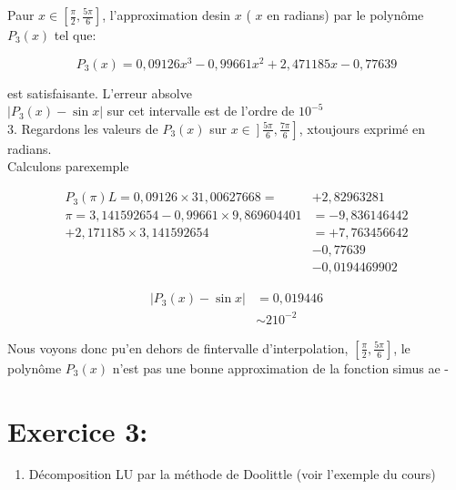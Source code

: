 \documentclass[10pt]{article}
\begin{document}
Paur \(x \in\left[\frac{\pi}{2}, \frac{5 \pi}{6}\right]\), l'approximation desin \(x\) ( \(x\) en radians) par le polynôme \(P_{3}(x)\) tel que:

\[
P_{3}(x)=0,09126 x^{3}-0,99661 x^{2}+2,471185 x-0,77639
\]

est satisfaisante. L'erreur absolve\\
\(\left|P_{3}(x)-\sin x\right|\) sur cet intervalle est de l'ordre de \(10^{-5}\)\\
3. Regardons les valeurs de \(P_{3}(x)\) sur \(\left.\left.x \in\right] \frac{5 \pi}{6}, \frac{7 \pi}{6}\right]\), xtoujours exprimé en radians.\\
Calculons parexemple

\[
\begin{aligned}
P_{3}(\pi) L=0,09126 \times 31,00627668= & +2,82963281 \\
\pi=3,141592654-0,99661 \times 9,869604401 & =-9,836146442 \\
+2,171185 \times 3,141592654 & =+7,763456642 \\
& -0,77639 \\
& -0,0194469902
\end{aligned}
\]

\[
\begin{aligned}
\left|P_{3}(x)-\sin x\right| & =0,019446 \\
& \sim 210^{-2}
\end{aligned}
\]

Nous voyons donc pu'en dehors de fintervalle d'interpolation, \(\left[\frac{\pi}{2}, \frac{5 \pi}{6}\right]\), le polynôme \(P_{3}(x)\) n'est pas une bonne approximation de la fonction simus ae -

\section*{Exercice 3:}
\begin{enumerate}
  \item Décomposition LU par la méthode de Doolittle (voir l'exemple du cours)
\end{enumerate}
\end{document}
